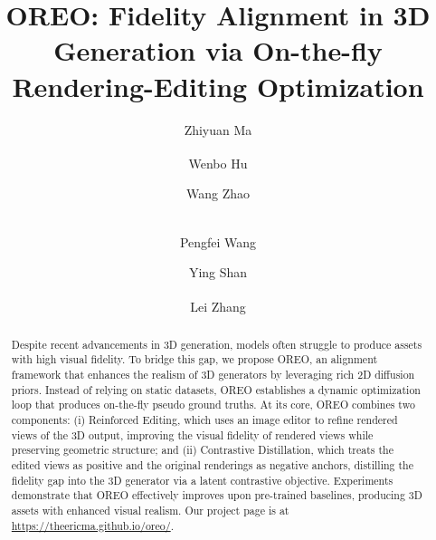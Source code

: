 \documentclass[runningheads]{llncs}
\begin{document}
\title{OREO: Fidelity Alignment in 3D Generation via On-the-fly Rendering-Editing Optimization}


\author{Zhiyuan Ma \and
Wenbo Hu\textsuperscript{\dag} \and
Wang Zhao \and\\
Pengfei Wang \and
Ying Shan \and
Lei Zhang\textsuperscript{\dag}}



\maketitle
\let\thefootnote\relax{}


\begin{abstract}
  Despite recent advancements in 3D generation, models often struggle to produce assets with high visual fidelity.
  To bridge this gap, we propose OREO, an alignment framework that enhances the realism of 3D generators by leveraging rich 2D diffusion priors.
  Instead of relying on static datasets, OREO establishes a dynamic optimization loop that produces on-the-fly pseudo ground truths.
  At its core, OREO combines two components: (i) Reinforced Editing, which uses an image editor to refine rendered views of the 3D output, improving the visual fidelity of rendered views while preserving geometric structure; and (ii) Contrastive Distillation, which treats the edited views as positive and the original renderings as negative anchors, distilling the fidelity gap into the 3D generator via a latent contrastive objective.
  Experiments demonstrate that OREO effectively improves upon pre-trained baselines, producing 3D assets with enhanced visual realism.
  Our project page is at \url{https://theericma.github.io/oreo/}.
\end{abstract}

\end{document}
